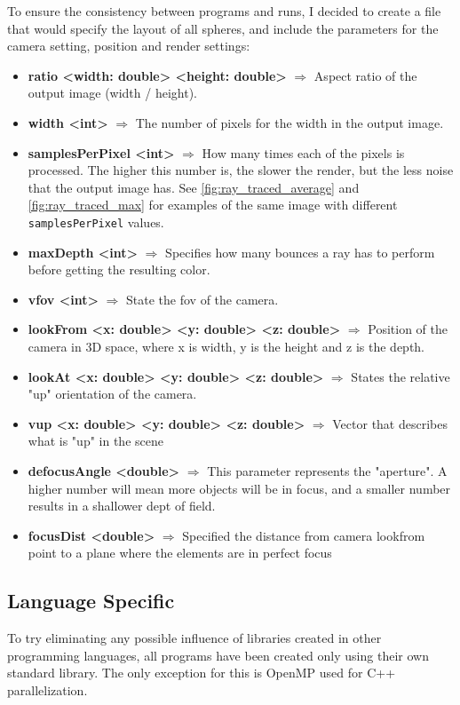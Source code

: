To ensure the consistency between programs and runs, I decided to create a file that would specify the layout of all spheres, and include the parameters for the camera setting, position and render settings:
\begin{itemize}
    \item \textbf{ratio <width: double> <height: double>} $\Rightarrow{}$ Aspect ratio of the output image (width / height).
    \item \textbf{width <int>} $\Rightarrow{}$ The number of pixels for the width in the output image.
    \item \textbf{samplesPerPixel <int>} $\Rightarrow{}$ How many times each of the pixels is processed. The higher this number is, the slower the render, but the less noise that the output image has. See \autoref{fig:ray_traced_average} and \autoref{fig:ray_traced_max} for examples of the same image with different \texttt{samplesPerPixel} values.
    \item \textbf{maxDepth <int>} $\Rightarrow{}$ Specifies how many bounces a ray has to perform before getting the resulting color.
    \item \textbf{vfov <int>} $\Rightarrow{}$ State the \gls{fov} of the camera.
    \item \textbf{lookFrom <x: double> <y: double> <z: double>} $\Rightarrow{}$ Position of the camera in 3D space, where x is width, y is the height and z is the depth.
    \item \textbf{lookAt <x: double> <y: double> <z: double>} $\Rightarrow{}$ States the relative "up" orientation of the camera.
    \item \textbf{vup <x: double> <y: double> <z: double>} $\Rightarrow{}$ Vector that describes what is "up" in the scene
    \item \textbf{defocusAngle <double>} $\Rightarrow{}$ This parameter represents the "aperture". A higher number will mean more objects will be in focus, and a smaller number results in a shallower dept of field.
    \item \textbf{focusDist <double>} $\Rightarrow{}$ Specified the distance from camera lookfrom point to a plane where the elements are in perfect focus
\end{itemize}

\subsection{Language Specific}
To try eliminating any possible influence of libraries created in other programming languages, all programs have been created only using their own standard library. The only exception for this is OpenMP used for C++ parallelization.

